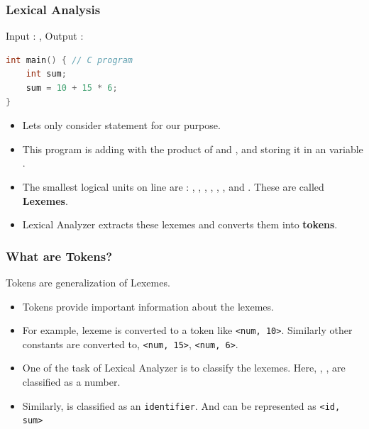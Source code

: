 \begin{frame}[fragile]
  \frametitle{Lexical Analysis}
    \begin{block}{}
        Input : , Output : 
    \end{block}

    \begin{lstlisting}[language=C, frame=leftline,]
int main() { // C program
    int sum;
    sum = 10 + 15 * 6;
}
\end{lstlisting}

    \begin{itemize}
        \item<2-> Lets only consider statement  for our purpose.
        \item<3-> This program is adding  with the product of  and , and storing it in an  variable .
        \item<4-> The smallest logical units on line  are : , \Code{=}, , \Code{+}, , \Code{*},  and \Codeb{;}. These are called \textbf{Lexemes}.
        \item<5-> Lexical Analyzer extracts these lexemes and converts them into \textbf{tokens}.
    \end{itemize}
\end{frame}


\begin{frame}
  \frametitle{What are Tokens?}
    \begin{block}{}
        Tokens are generalization of Lexemes.
    \end{block}

    \begin{itemize}
        \item<1-> Tokens provide important information about the lexemes.
        \item<2-> For example, lexeme  is converted to a token like \texttt{<num, 10>}. Similarly other constants are converted to, \texttt{<num, 15>}, \texttt{<num, 6>}.
        \item<3-> One of the task of Lexical Analyzer is to classify the lexemes. Here, , ,  are classified as a number.
        \item<4-> Similarly,  is classified as an \texttt{identifier}. And can be represented as \texttt{<id, sum>}

    \end{itemize}
\end{frame}


